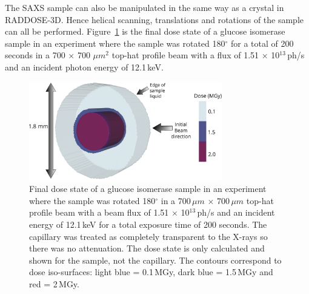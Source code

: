 The SAXS sample can also be manipulated in the same way as a crystal in RADDOSE-3D.
Hence helical scanning, translations and rotations of the sample can all be performed.
Figure~\ref{fig:SAXS cylinder rotated} is the final dose state of a glucose isomerase sample in an experiment where the sample was rotated 180$^{\circ}$ for a total of 200 seconds in a 700 $\times$ 700 $\mu m^{\text{2}}$ top-hat profile beam with a flux of 1.51 $\times$ 10$^{\text{13}}\,$ph/s and an incident photon energy of 12.1$\,$keV.
\begin{figure}
    \centering
    \includegraphics[width=0.75\textwidth]{figures/saxs/SAXScylinder.pdf}
    \caption[RADDOSE-3D dose contour plot of a cylindrical SAXS sample.]{Final dose state of a glucose isomerase sample in an experiment where the sample was rotated 180$^{\circ}$ in a 700\,$\mu m$ $\times$ 700\,$\mu m $ top-hat profile beam with a beam flux of 1.51 $\times$ 10$^{\text{13}}\,$ph/s and an incident energy of 12.1\,keV for a total exposure time of 200 seconds.
    The capillary was treated as completely transparent to the X-rays so there was no attenuation.
    The dose state is only calculated and shown for the sample, not the capillary.
    The contours correspond to dose iso-surfaces: light blue = 0.1\,MGy, dark blue = 1.5\,MGy and red = 2\,MGy.}
    \label{fig:SAXS cylinder rotated}
\end{figure}
